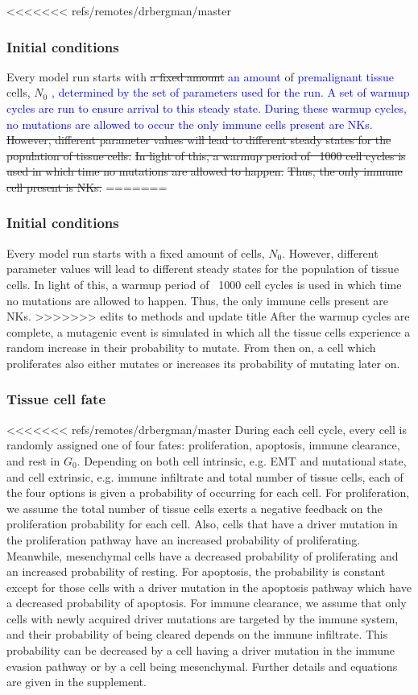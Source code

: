 \documentclass[11pt]{article}
\newcommand{\tcb} { \textcolor{blue} }
\begin{document}
<<<<<<< refs/remotes/drbergman/master
\subsubsection{Initial conditions} 
Every model run starts with \sout{a fixed amount} \tcb{an amount} of \tcb{premalignant tissue} cells, $N_0$ \tcb{, determined by the set of parameters used for the run.
A set of warmup cycles are run to ensure arrival to this steady state.
During these warmup cycles, no mutations are allowed to occur the only immune cells present are NKs.}
\sout{However, different parameter values will lead to different steady states for the population of tissue cells.}
\sout{In light of this, a warmup period of ~1000 cell cycles is used in which time no mutations are allowed to happen.}
\sout{Thus, the only immune cell present is NKs.}
=======
\subsubsection{Initial conditions} Every model run starts with a fixed amount of cells, $N_0$.
However, different parameter values will lead to different steady states for the population of tissue cells.
In light of this, a warmup period of ~1000 cell cycles is used in which time no mutations are allowed to happen.
Thus, the only immune cells present are NKs.
>>>>>>> edits to methods and update title
After the warmup cycles are complete, a mutagenic event is simulated in which all the tissue cells experience a random increase in their probability to mutate.
From then on, a cell which proliferates also either mutates or increases its probability of mutating later on.

\subsubsection{Tissue cell fate}
<<<<<<< refs/remotes/drbergman/master
During each cell cycle, every cell is randomly assigned one of four fates: proliferation, apoptosis, immune clearance, and rest in $G_0$.
Depending on both cell intrinsic, e.g. EMT and mutational state, and cell extrinsic, e.g. immune infiltrate and total number of tissue cells, each of the four options is given a probability of occurring for each cell.
For proliferation, we assume the total number of tissue cells exerts a negative feedback on the proliferation probability for each cell.
Also, cells that have a driver mutation in the proliferation pathway have an increased probability of proliferating.
Meanwhile, mesenchymal cells have a decreased probability of proliferating and an increased probability of resting.
For apoptosis, the probability is constant except for those cells with a driver mutation in the apoptosis pathway which have a decreased probability of apoptosis.
For immune clearance, we assume that only cells with newly acquired driver mutations are targeted by the immune system, and their probability of being cleared depends on the immune infiltrate.
This probability can be decreased by a cell having a driver mutation in the immune evasion pathway or by a cell being mesenchymal.
Further details and equations are given in the supplement.
\end{document}
